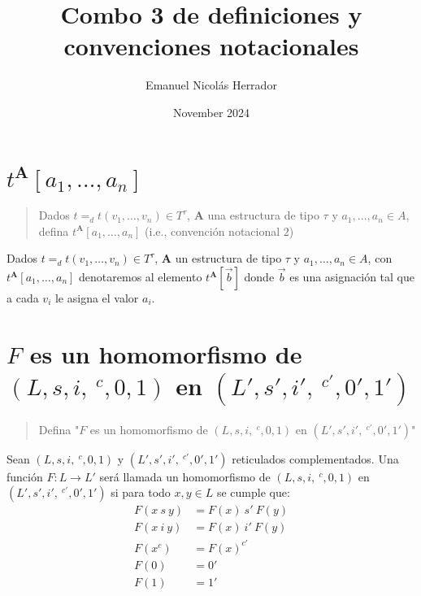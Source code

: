\documentclass{article}
\title{Combo 3 de definiciones y convenciones notacionales}
\author{Emanuel Nicolás Herrador}
\date{November 2024}
\begin{document}
\maketitle

\section{$t^\mathbf{A}[a_1,\dots,a_n]$}
\begin{quote}
  Dados $t=_d t(v_1,\dots,v_n)\in T^\tau$, $\mathbf{A}$ una estructura de tipo $\tau$ y $a_1,\dots,a_n\in A$, defina $t^\mathbf{A}[a_1,\dots,a_n]$ (i.e., convención notacional $2$)
\end{quote}
Dados $t=_d t(v_1,\dots,v_n)\in T^\tau$, $\mathbf{A}$ un estructura de tipo $\tau$ y $a_1,\dots,a_n\in A$, con $t^\mathbf{A}[a_1,\dots,a_n]$ denotaremos al elemento $t^\mathbf{A}[\vec{b}]$ donde $\vec{b}$ es una asignación tal que a cada $v_i$ le asigna el valor $a_i$.

\section{$F$ es un homomorfismo de $(L,s,i,\ ^c,0,1)$ en $(L',s',i',\ ^{c'},0',1')$}
\begin{quote}
  Defina "$F$ es un homomorfismo de $(L,s,i,\ ^c,0,1)$ en $(L',s',i',\ ^{c'},0',1')$"
\end{quote}
Sean $(L,s,i,\ ^c,0,1)$ y $(L',s',i',\ ^{c'},0',1')$ reticulados complementados. Una función $F:L\to L'$ será llamada un homomorfismo de $(L,s,i,\ ^c,0,1)$ en $(L',s',i',\ ^{c'},0',1')$ si para todo $x,y\in L$ se cumple que:
\begin{equation*}
  \begin{aligned}
    F(x\ s\ y) & = F(x)\ s'\ F(y) \\
    F(x\ i\ y) & = F(x)\ i'\ F(y) \\
    F(x^c)     & = F(x)^{c'}      \\
    F(0)       & = 0'             \\
    F(1)       & = 1'
  \end{aligned}
\end{equation*}
\end{document}
